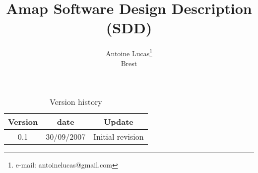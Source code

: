\documentclass[twoside,10pt]{article}
\title{\bf Amap Software Design Description \\(SDD)}
\author{Antoine Lucas\thanks{e-mail: antoinelucas@gmail.com}\\[0.2cm]
\normalsize Brest
}
\begin{document}
\maketitle

\sloppy



\begin{table}[htb]
\centering
\begin{tabular}{ccc}
\hline
\bf Version & \bf date & \bf Update \\
\hline
\hline
0.1 & 30/09/2007  & Initial revision\\
\hline
\end{tabular}
\caption{Version history}
\end{table}




\end{document}
